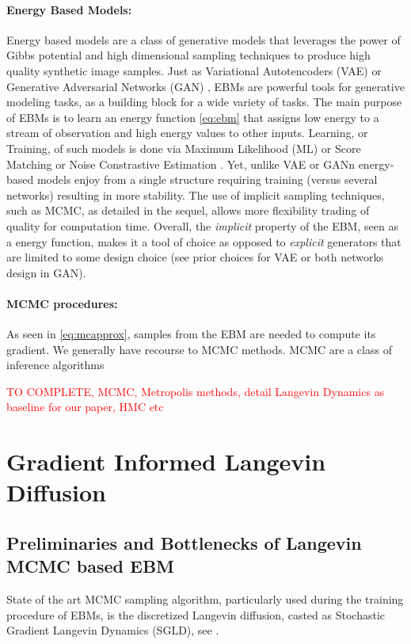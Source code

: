 \documentclass{article}
\begin{document}
\paragraph{Energy Based Models: }
Energy based models \cite{lecun2006tutorial,ngiam2011learning} are a class of generative models that leverages the power of Gibbs potential and high dimensional sampling techniques to produce high quality synthetic image samples.
Just as Variational Autotencoders (VAE) \citep{kingma2013auto} or Generative Adversarial Networks (GAN) \citep{goodfellow2014generative}, EBMs are powerful tools for generative modeling tasks, as a building block for a wide variety of tasks. 
The main purpose of EBMs is to learn an energy function \eqref{eq:ebm} that assigns low energy to a stream of observation and high energy values to other inputs.
Learning, or Training, of such models is done via Maximum Likelihood (ML) \citep{du2019implicit} or Score Matching \citep{song2020score} or Noise Constrastive Estimation \citep{gao2020flow}.
Yet, unlike VAE or GANn energy-based models enjoy from a single structure requiring training (versus several networks) resulting in more stability.
The use of implicit sampling techniques, such as MCMC, as detailed in the sequel, allows more flexibility trading of quality for computation time.
Overall, the \emph{implicit} property of the EBM, seen as a energy function, makes it a tool of choice as opposed to \emph{explicit} generators that are limited to some design choice (see prior choices for VAE or both networks design in GAN).


\paragraph{MCMC procedures: }
As seen in \eqref{eq:mcapprox}, samples from the EBM are needed to compute its gradient.
We generally have recourse to MCMC methods.
MCMC are a class of inference algorithms

\textcolor{red}{TO COMPLETE, MCMC, Metropolis methods, detail Langevin Dynamics as baseline for our paper, HMC etc}

\section{Gradient Informed Langevin Diffusion}\label{sec:main}

\subsection{Preliminaries and Bottlenecks of Langevin MCMC based EBM}
State of the art MCMC sampling algorithm, particularly used during the training procedure of EBMs, is the discretized Langevin diffusion, casted as Stochastic Gradient Langevin Dynamics (SGLD), see \cite{welling2011bayesian}.
\end{document}
